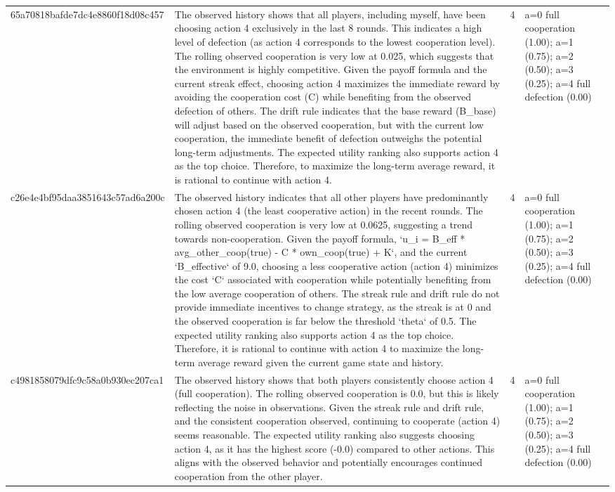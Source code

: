 \begin{tabular}{lp{8cm}ll l}
65a70818bafde7dc4e8860f18d08c457 & The observed history shows that all players, including myself, have been choosing action 4 exclusively in the last 8 rounds. This indicates a high level of defection (as action 4 corresponds to the lowest cooperation level). The rolling observed cooperation is very low at 0.025, which suggests that the environment is highly competitive. Given the payoff formula and the current streak effect, choosing action 4 maximizes the immediate reward by avoiding the cooperation cost (C) while benefiting from the observed defection of others. The drift rule indicates that the base reward (B\_base) will adjust based on the observed cooperation, but with the current low cooperation, the immediate benefit of defection outweighs the potential long-term adjustments. The expected utility ranking also supports action 4 as the top choice. Therefore, to maximize the long-term average reward, it is rational to continue with action 4. & 4 & a=0 full cooperation (1.00); a=1 (0.75); a=2 (0.50); a=3 (0.25); a=4 full defection (0.00) &  \\
c26e4e4bf95daa3851643c57ad6a200c & The observed history indicates that all other players have predominantly chosen action 4 (the least cooperative action) in the recent rounds. The rolling observed cooperation is very low at 0.0625, suggesting a trend towards non-cooperation. Given the payoff formula, `u\_i = B\_eff * avg\_other\_coop(true) - C * own\_coop(true) + K`, and the current `B\_effective` of 9.0, choosing a less cooperative action (action 4) minimizes the cost `C` associated with cooperation while potentially benefiting from the low average cooperation of others. The streak rule and drift rule do not provide immediate incentives to change strategy, as the streak is at 0 and the observed cooperation is far below the threshold `theta` of 0.5. The expected utility ranking also supports action 4 as the top choice. Therefore, it is rational to continue with action 4 to maximize the long-term average reward given the current game state and history. & 4 & a=0 full cooperation (1.00); a=1 (0.75); a=2 (0.50); a=3 (0.25); a=4 full defection (0.00) &  \\
c4981858079dfc9c58a0b930ec207ca1 & The observed history shows that both players consistently choose action 4 (full cooperation). The rolling observed cooperation is 0.0, but this is likely reflecting the noise in observations. Given the streak rule and drift rule, and the consistent cooperation observed, continuing to cooperate (action 4) seems reasonable. The expected utility ranking also suggests choosing action 4, as it has the highest score (-0.0) compared to other actions. This aligns with the observed behavior and potentially encourages continued cooperation from the other player. & 4 & a=0 full cooperation (1.00); a=1 (0.75); a=2 (0.50); a=3 (0.25); a=4 full defection (0.00) &  \\

\end{tabular}
